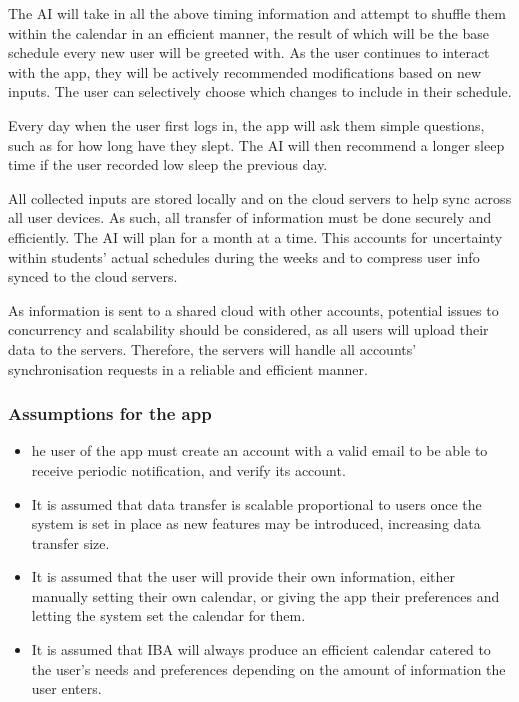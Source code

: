\documentclass[a4paper,11pt]{article} %
\begin{document}
The AI will take in all the above timing information and attempt to shuffle them within the calendar in an efficient manner, the result of which will be the base schedule every new user will be greeted with. As the user continues to interact with the app, they will be actively recommended modifications based on new inputs. The user can selectively choose which changes to include in their schedule.

Every day when the user first logs in, the app will ask them simple questions, such as for how long have they slept. The AI will then recommend a longer sleep time if the user recorded low sleep the previous day. 


All collected inputs are stored locally and on the cloud servers to help sync across all user devices. As such, all transfer of information must be done securely and efficiently.
The AI will plan for a month at a time. This accounts for uncertainty within students’ actual schedules during the weeks and to compress user info synced to the cloud servers. 

As information is sent to a shared cloud with other accounts, potential issues to concurrency and scalability should be considered, as all users will upload their data to the servers. 
Therefore, the servers will handle all accounts’ synchronisation requests in a reliable and efficient manner.

\subsubsection*{Assumptions for the app}
\begin{itemize}
    \item he user of the app must create an account with a valid email to be able to receive periodic notification, and verify its account. 
    \item It is assumed that data transfer is scalable proportional to users once the system is set in place as new features may be introduced, increasing data transfer size. 
    \item It is assumed that the user will provide their own information, either manually setting their own calendar, or giving the app their preferences and letting the system set the calendar for them.
    \item It is assumed that IBA will always produce an efficient calendar catered to the user’s needs and preferences depending on the amount of information the user enters.
\end{itemize}
\end{document}
